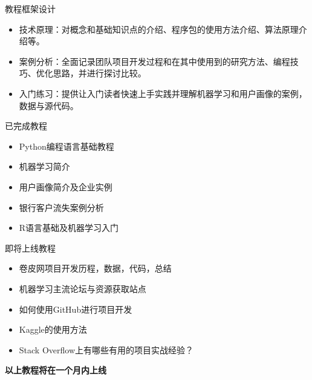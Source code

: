 \documentclass[10pt]{beamer}
\begin{document}
\begin{frame}{教程框架设计}
\begin{itemize}
\item 技术原理：对概念和基础知识点的介绍、程序包的使用方法介绍、算法原理介绍等。\newline
\item 案例分析：全面记录团队项目开发过程和在其中使用到的研究方法、编程技巧、优化思路，并进行探讨比较。\newline
\item 入门练习：提供让入门读者快速上手实践并理解机器学习和用户画像的案例，数据与源代码。\newline
\end{itemize}
\end{frame}

\begin{frame}{已完成教程}
  \begin{itemize}
    \item Python编程语言基础教程\newline
    \item 机器学习简介\newline
    \item 用户画像简介及企业实例\newline
    \item 银行客户流失案例分析\newline
    \item R语言基础及机器学习入门\newline
  \end{itemize}
\end{frame}

\begin{frame}{即将上线教程}
  \begin{itemize}
    \item 卷皮网项目开发历程，数据，代码，总结\newline
    \item 机器学习主流论坛与资源获取站点\newline
    \item 如何使用GitHub进行项目开发\newline
    \item Kaggle的使用方法\newline
    \item Stack Overflow上有哪些有用的项目实战经验？\newline\newline
  \end{itemize}
  \textbf{以上教程将在一个月内上线}
\end{frame}
\end{document}
